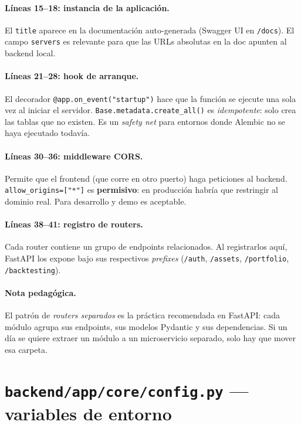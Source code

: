 \documentclass[11pt,a4paper]{book}
\begin{document}
\paragraph{Líneas 15--18: instancia de la aplicación.} El \texttt{title} aparece en la documentación auto-generada (Swagger UI en \texttt{/docs}). El campo \texttt{servers} es relevante para que las URLs absolutas en la doc apunten al backend local.

\paragraph{Líneas 21--28: hook de arranque.} El decorador \texttt{@app.on\_event("startup")} hace que la función se ejecute una sola vez al iniciar el servidor. \texttt{Base.metadata.create\_all()} es \emph{idempotente}: solo crea las tablas que no existen. Es un \textit{safety net} para entornos donde Alembic no se haya ejecutado todavía.

\paragraph{Líneas 30--36: middleware CORS.} Permite que el frontend (que corre en otro puerto) haga peticiones al backend. \texttt{allow\_origins=["*"]} es \textbf{permisivo}: en producción habría que restringir al dominio real. Para desarrollo y demo es aceptable.

\paragraph{Líneas 38--41: registro de routers.} Cada router contiene un grupo de endpoints relacionados. Al registrarlos aquí, FastAPI los expone bajo sus respectivos \textit{prefixes} (\texttt{/auth}, \texttt{/assets}, \texttt{/portfolio}, \texttt{/backtesting}).

\paragraph{Nota pedagógica.} El patrón de \textit{routers separados} es la práctica recomendada en FastAPI: cada módulo agrupa sus endpoints, sus modelos Pydantic y sus dependencias. Si un día se quiere extraer un módulo a un microservicio separado, solo hay que mover esa carpeta.

\section{\texttt{backend/app/core/config.py} --- variables de entorno}
\end{document}
